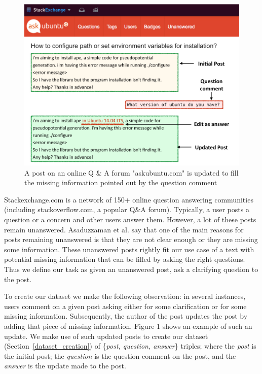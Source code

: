\documentclass[11pt]{article}
\begin{document}
\begin{figure}[!t]
\centering
\includegraphics[scale=0.25]{askubuntu_post}
\caption{A post on an online Q \& A forum "askubuntu.com" is updated to fill the missing information pointed out by the question comment}
\label{askubuntu_post}
\end{figure}

Stackexchange.com is a network of 150+ online question answering communities (including stackoverflow.com, a popular Q\&A forum). Typically, a user posts a question or a concern and other users answer them. However, a lot of these posts remain unanswered. Asaduzzaman et al.  say that one of the main reasons for posts remaining unanswered is that they are not clear enough or they are missing some information. These unanswered posts rightly fit our use case of a text with potential missing information that can be filled by asking the right questions. Thus we define our task as given an unanswered post, ask a clarifying question to the post. 

To create our dataset we make the following observation: in several instances, users comment on a given post asking either for some clarification or for some missing information. Subsequently, the author of the post updates the post by adding that piece of missing information. Figure 1 shows an example of such an update. We make use of such updated posts to create our dataset (Section~\ref{dataset_creation}) of \{\textit{post, question, answer}\} triples; where the \textit{post} is the initial post; the \textit{question} is the question comment on the post, and the \textit{answer} is the update made to the post. 
\end{document}
